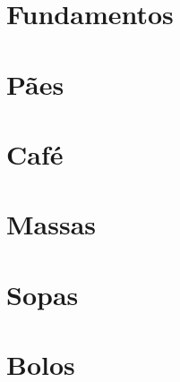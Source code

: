 \chapter{Fundamentos}
\label{chap:fundamentos}


\chapter{Pães}
\label{chap:paes}


\chapter{Café}
\label{chap:cafe}

\chapter{Massas}
\label{chap:massas}

\chapter{Sopas}
\label{chap:sopas}

\chapter{Bolos}
\label{chap:bolos}
